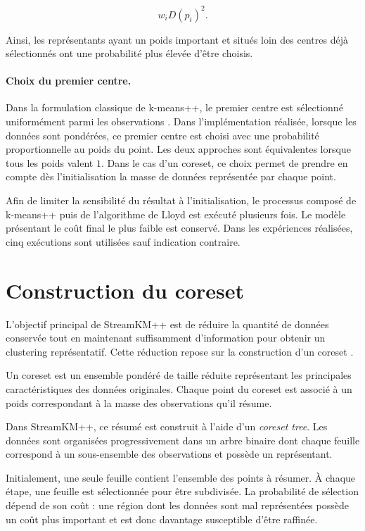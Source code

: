 \[
w_i D(p_i)^2.
\]

Ainsi, les représentants ayant un poids important et situés loin des centres déjà sélectionnés ont une probabilité plus élevée d'être choisis.

\paragraph{Choix du premier centre.}

Dans la formulation classique de k-means++, le premier centre est sélectionné uniformément parmi les observations \cite{arthur2007}. Dans l'implémentation réalisée, lorsque les données sont pondérées, ce premier centre est choisi avec une probabilité proportionnelle au poids du point. Les deux approches sont équivalentes lorsque tous les poids valent \(1\). Dans le cas d'un coreset, ce choix permet de prendre en compte dès l'initialisation la masse de données représentée par chaque point.

Afin de limiter la sensibilité du résultat à l'initialisation, le processus composé de k-means++ puis de l'algorithme de Lloyd est exécuté plusieurs fois. Le modèle présentant le coût final le plus faible est conservé. Dans les expériences réalisées, cinq exécutions sont utilisées sauf indication contraire.

\section{Construction du coreset}

L'objectif principal de StreamKM++ est de réduire la quantité de données conservée tout en maintenant suffisamment d'information pour obtenir un clustering représentatif. Cette réduction repose sur la construction d'un coreset \cite{ackermann2012}.

Un coreset est un ensemble pondéré de taille réduite représentant les principales caractéristiques des données originales. Chaque point du coreset est associé à un poids correspondant à la masse des observations qu'il résume.

Dans StreamKM++, ce résumé est construit à l'aide d'un \emph{coreset tree}. Les données sont organisées progressivement dans un arbre binaire dont chaque feuille correspond à un sous-ensemble des observations et possède un représentant.

Initialement, une seule feuille contient l'ensemble des points à résumer. À chaque étape, une feuille est sélectionnée pour être subdivisée. La probabilité de sélection dépend de son coût : une région dont les données sont mal représentées possède un coût plus important et est donc davantage susceptible d'être raffinée.

